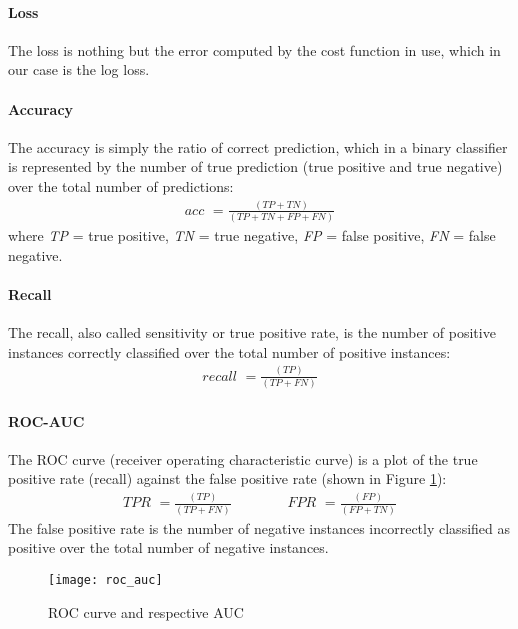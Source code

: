 \paragraph{Loss} The loss is nothing but the error computed by the cost function in use, which in our case is the log loss.


\paragraph{Accuracy} The accuracy is simply the ratio of correct prediction, which in a binary classifier is represented by the number of true prediction (true positive and true negative) over the total number of predictions:
\begin{align}
    \textit{acc } = \frac{(TP + TN)}{(TP + TN + FP + FN)}
\end{align}
where \textit{TP} = true positive, \textit{TN} = true negative, \textit{FP} = false positive, \textit{FN} = false negative.

\paragraph{Recall} The recall, also called sensitivity or true positive rate, is the number of positive instances correctly classified over the total number of positive instances:
\begin{align}
    \textit{recall } = \frac{(TP)}{(TP + FN)}
\end{align}

\paragraph{ROC-AUC} The ROC curve (receiver operating characteristic curve) is a plot of the true positive rate (recall) against the false positive rate (shown in Figure \ref{fig:roc_auc}):
\begin{align}
    \textit{TPR } = \frac{(TP)}{(TP + FN)} \qquad\qquad \textit{FPR } = \frac{(FP)}{(FP + TN)}
\end{align}
The false positive rate is the number of negative instances incorrectly classified as positive over the total number of negative instances.
\begin{figure}[htbp]
    \centering
    \texttt{[image: roc\_auc]}
    \caption{ROC curve and respective AUC}
    \label{fig:roc_auc}
\end{figure}

